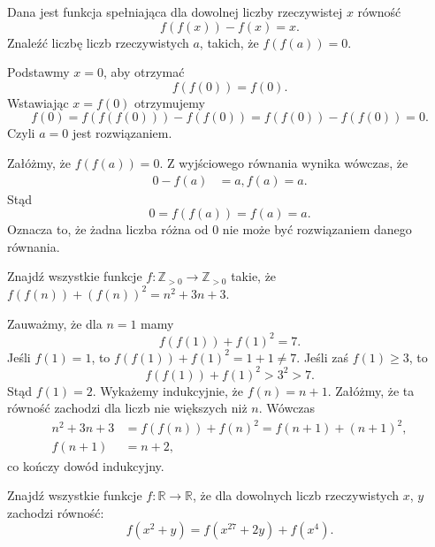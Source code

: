 \newpage
{}

\begin{problem}{1}
	Dana jest funkcja spełniająca dla dowolnej liczby rzeczywistej $x$ równość
	\[
		f(f(x)) - f(x) = x.
	\]
	Znaleźć liczbę liczb rzeczywistych $a$, takich, że $f(f(a)) = 0$.
\end{problem}


\noindent
Podstawmy $x = 0$, aby otrzymać
\[
	f(f(0)) = f(0).
\]
Wstawiając $x = f(0)$ otrzymujemy
\[
	f(0) = f(f(f(0))) - f(f(0)) = f(f(0)) - f(f(0)) = 0.
\]
Czyli $a = 0$ jest rozwiązaniem.

\vspace{10px}

\noindent
Załóżmy, że $f(f(a)) = 0$. Z wyjściowego równania wynika wówczas, że
\begin{align*}
	0 - f(a) &= a,
	f(a) = a.
\end{align*}
Stąd
\[
	0 = f(f(a)) = f(a) = a.
\]
Oznacza to, że żadna liczba różna od $0$ nie może być rozwiązaniem danego równania.


\begin{problem}{2}
	Znajdź wszystkie funkcje  $ f: \mathbb{Z}_{>0} \to \mathbb{Z}_{>0}$ takie, że  $f(f(n)) + (f(n))^2 = n^2 + 3n + 3$.
\end{problem}


\noindent
Zauważmy, że dla $n = 1$ mamy
\[
	f(f(1)) + f(1)^2 = 7.
\]
Jeśli $f(1) = 1$, to $f(f(1)) + f(1)^2 = 1 + 1 \neq 7$. Jeśli zaś $f(1) \geqslant 3$, to
\[
	f(f(1)) + f(1)^2 > 3^2 > 7.
\]
Stąd $f(1) = 2$. Wykażemy indukcyjnie, że $f(n) = n + 1$. Załóżmy, że ta równość zachodzi dla liczb nie większych niż $n$. Wówczas
\begin{align*}
	n^2 + 3n + 3 &= f(f(n)) + f(n)^2 = f(n + 1) + (n + 1)^2, \\
	f(n + 1) &= n + 2,
\end{align*}
co kończy dowód indukcyjny. 


\begin{problem}{3}
	Znajdź wszystkie funkcje $f:\mathbb{R} \to \mathbb{R}$, że dla dowolnych liczb rzeczywistych $x$, $y$ zachodzi równość:
	\[
		f(x^2 + y) = f(x^{27} + 2y) + f(x^4).
	\]
\end{problem}

